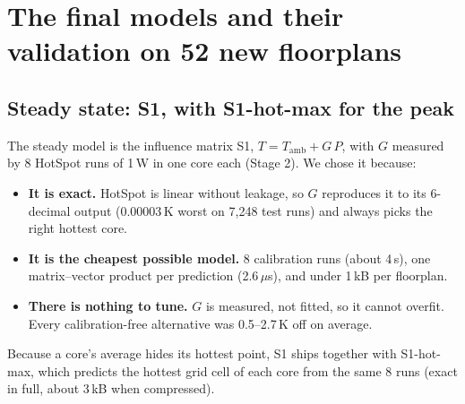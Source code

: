 \documentclass[11pt,a4paper]{article}
\newcommand{\us}{\,$\mu$s}
\begin{document}
\section{The final models and their validation on 52 new floorplans}

\subsection{Steady state: S1, with S1-hot-max for the peak}
The steady model is the influence matrix S1, $T = T_\text{amb} + G\,P$, with $G$ measured by 8
HotSpot runs of 1\,W in one core each (Stage 2). We chose it because:
\begin{itemize}
  \item \textbf{It is exact.} HotSpot is linear without leakage, so $G$ reproduces it to its
        6-decimal output (0.00003\,K worst on 7{,}248 test runs) and always picks the right
        hottest core.
  \item \textbf{It is the cheapest possible model.} 8 calibration runs (about 4\,s), one
        matrix--vector product per prediction (2.6\us), and under 1\,kB per floorplan.
  \item \textbf{There is nothing to tune.} $G$ is measured, not fitted, so it cannot overfit.
        Every calibration-free alternative was 0.5--2.7\,K off on average.
\end{itemize}
Because a core's average hides its hottest point, S1 ships together with S1-hot-max, which
predicts the hottest grid cell of each core from the same 8 runs (exact in full, about 3\,kB when
compressed).
\end{document}

